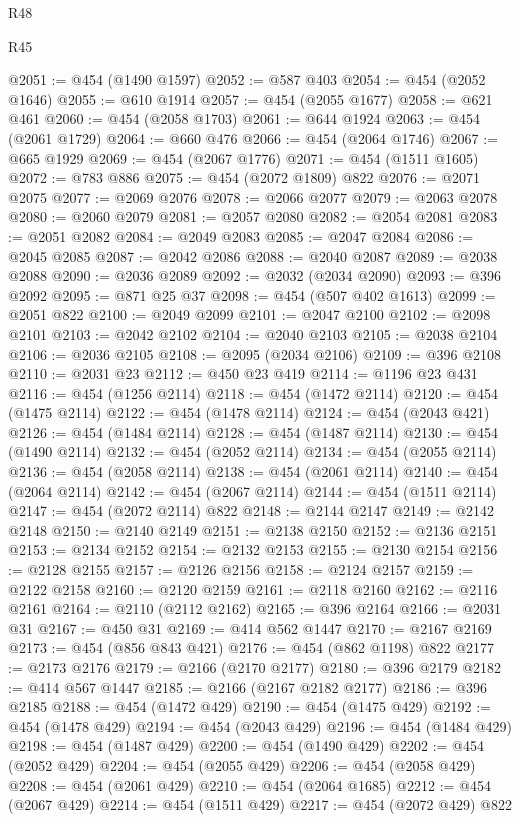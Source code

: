 \begin{lexlean}{R48}
\begin{lexlean}{R45}
\begin{coremodule}
{{{{{{{{{{{{{{{{{{{{{{{{{{{{{{{{{{{{{{{{{{{{{{{{{{{{{{{{{{{{{{{{{{{{{{{{{{{{{{{{{{{{{{{{{{{@2051 := @454 (@1490 @1597)
@2052 := @587 @403
@2054 := @454 (@2052 @1646)
@2055 := @610 @1914
@2057 := @454 (@2055 @1677)
@2058 := @621 @461
@2060 := @454 (@2058 @1703)
@2061 := @644 @1924
@2063 := @454 (@2061 @1729)
@2064 := @660 @476
@2066 := @454 (@2064 @1746)
@2067 := @665 @1929
@2069 := @454 (@2067 @1776)
@2071 := @454 (@1511 @1605)
@2072 := @783 @886
@2075 := @454 (@2072 @1809) @822
@2076 := @2071 @2075
@2077 := @2069 @2076
@2078 := @2066 @2077
@2079 := @2063 @2078
@2080 := @2060 @2079
@2081 := @2057 @2080
@2082 := @2054 @2081
@2083 := @2051 @2082
@2084 := @2049 @2083
@2085 := @2047 @2084
@2086 := @2045 @2085
@2087 := @2042 @2086
@2088 := @2040 @2087
@2089 := @2038 @2088
@2090 := @2036 @2089
@2092 := @2032 (@2034 @2090)
@2093 := @396 @2092
@2095 := @871 @25 @37
@2098 := @454 (@507 @402 @1613)
@2099 := @2051 @822
@2100 := @2049 @2099
@2101 := @2047 @2100
@2102 := @2098 @2101
@2103 := @2042 @2102
@2104 := @2040 @2103
@2105 := @2038 @2104
@2106 := @2036 @2105
@2108 := @2095 (@2034 @2106)
@2109 := @396 @2108
@2110 := @2031 @23
@2112 := @450 @23 @419
@2114 := @1196 @23 @431
@2116 := @454 (@1256 @2114)
@2118 := @454 (@1472 @2114)
@2120 := @454 (@1475 @2114)
@2122 := @454 (@1478 @2114)
@2124 := @454 (@2043 @421)
@2126 := @454 (@1484 @2114)
@2128 := @454 (@1487 @2114)
@2130 := @454 (@1490 @2114)
@2132 := @454 (@2052 @2114)
@2134 := @454 (@2055 @2114)
@2136 := @454 (@2058 @2114)
@2138 := @454 (@2061 @2114)
@2140 := @454 (@2064 @2114)
@2142 := @454 (@2067 @2114)
@2144 := @454 (@1511 @2114)
@2147 := @454 (@2072 @2114) @822
@2148 := @2144 @2147
@2149 := @2142 @2148
@2150 := @2140 @2149
@2151 := @2138 @2150
@2152 := @2136 @2151
@2153 := @2134 @2152
@2154 := @2132 @2153
@2155 := @2130 @2154
@2156 := @2128 @2155
@2157 := @2126 @2156
@2158 := @2124 @2157
@2159 := @2122 @2158
@2160 := @2120 @2159
@2161 := @2118 @2160
@2162 := @2116 @2161
@2164 := @2110 (@2112 @2162)
@2165 := @396 @2164
@2166 := @2031 @31
@2167 := @450 @31
@2169 := @414 @562 @1447
@2170 := @2167 @2169
@2173 := @454 (@856 @843 @421)
@2176 := @454 (@862 @1198) @822
@2177 := @2173 @2176
@2179 := @2166 (@2170 @2177)
@2180 := @396 @2179
@2182 := @414 @567 @1447
@2185 := @2166 (@2167 @2182 @2177)
@2186 := @396 @2185
@2188 := @454 (@1472 @429)
@2190 := @454 (@1475 @429)
@2192 := @454 (@1478 @429)
@2194 := @454 (@2043 @429)
@2196 := @454 (@1484 @429)
@2198 := @454 (@1487 @429)
@2200 := @454 (@1490 @429)
@2202 := @454 (@2052 @429)
@2204 := @454 (@2055 @429)
@2206 := @454 (@2058 @429)
@2208 := @454 (@2061 @429)
@2210 := @454 (@2064 @1685)
@2212 := @454 (@2067 @429)
@2214 := @454 (@1511 @429)
@2217 := @454 (@2072 @429) @822
}}}}}}}}}}}}}}}}}}}}}}}}}}}}}}}}}}}}}}}}}}}}}}}}}}}}}}}}}}}}}}}}}}}}}}}}}}}}}}}}}}}}}}}}}}}
\end{coremodule}
\end{lexlean}
\end{lexlean}
